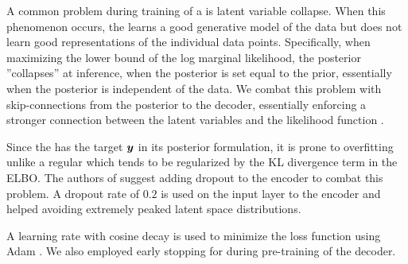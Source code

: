 A common problem during training of a \vae{} is latent variable collapse. When this phenomenon occurs, the \vae{} learns a good generative model of the data but does not learn good representations of the individual data points. Specifically, when maximizing the lower bound of the log marginal likelihood, the posterior ''collapses'' at inference, when the posterior is set equal to the prior, essentially when the posterior is independent of the data. We combat this problem with skip-connections from the posterior to the decoder, essentially enforcing a stronger connection between the latent variables and the likelihood function \parencite{Dieng2018}.

Since the \cvae{} has the target $\boldsymbol{y}$ in its posterior formulation, it is prone to overfitting unlike a regular \vae{} which tends to be regularized by the KL divergence term in the ELBO. The authors of \parencite{Sohn2015} suggest adding dropout to the encoder to combat this problem. A dropout rate of $0.2$ is used on the input layer to the encoder and helped avoiding extremely peaked latent space distributions.

A learning rate with cosine decay is used to minimize the loss function using Adam \parencite{kingma2014adam}. We also employed early stopping for during pre-training of the decoder.